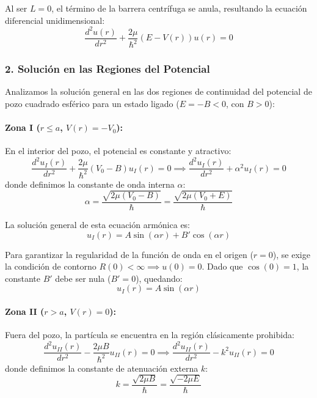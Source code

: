 \begin{problema}
Al ser $L = 0$, el término de la barrera centrífuga se anula, resultando la ecuación diferencial unidimensional:
\begin{equation*}
\frac{d^2 u(r)}{dr^2} + \frac{2\mu}{\hbar^2} \left( E - V(r) \right) u(r) = 0
\end{equation*}

\newpage
\subsubsection*{2. Solución en las Regiones del Potencial}

Analizamos la solución general en las dos regiones de continuidad del potencial de pozo cuadrado esférico para un estado ligado ($E = -B < 0$, con $B > 0$):

\paragraph{Zona I ($r \le a$, $V(r) = -V_0$):}
En el interior del pozo, el potencial es constante y atractivo:
\begin{equation*}
\frac{d^2 u_I(r)}{dr^2} + \frac{2\mu}{\hbar^2} (V_0 - B) u_I(r) = 0 \implies \frac{d^2 u_I(r)}{dr^2} + \alpha^2 u_I(r) = 0
\end{equation*}
donde definimos la constante de onda interna $\alpha$:
\begin{equation*}
\alpha = \frac{\sqrt{2\mu (V_0 - B)}}{\hbar} = \frac{\sqrt{2\mu (V_0 + E)}}{\hbar}
\end{equation*}

La solución general de esta ecuación armónica es:
\begin{equation*}
u_I(r) = A \sin(\alpha r) + B' \cos(\alpha r)
\end{equation*}

Para garantizar la regularidad de la función de onda en el origen ($r = 0$), se exige la condición de contorno $R(0) < \infty \implies u(0) = 0$. Dado que $\cos(0) = 1$, la constante $B'$ debe ser nula ($B' = 0$), quedando:
\begin{equation*}
u_I(r) = A \sin(\alpha r)
\end{equation*}

\paragraph{Zona II ($r > a$, $V(r) = 0$):}
Fuera del pozo, la partícula se encuentra en la región clásicamente prohibida:
\begin{equation*}
\frac{d^2 u_{II}(r)}{dr^2} - \frac{2\mu B}{\hbar^2} u_{II}(r) = 0 \implies \frac{d^2 u_{II}(r)}{dr^2} - k^2 u_{II}(r) = 0
\end{equation*}
donde definimos la constante de atenuación externa $k$:
\begin{equation*}
k = \frac{\sqrt{2\mu B}}{\hbar} = \frac{\sqrt{-2\mu E}}{\hbar}
\end{equation*}


\end{problema}
